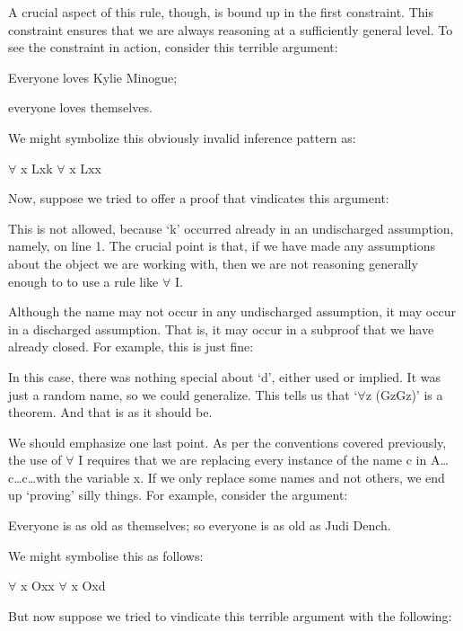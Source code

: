 A crucial aspect of this rule, though, is bound up in the first constraint. This constraint ensures that we are always reasoning at a sufficiently general level. To see the constraint in action, consider this terrible argument:
\begin{earg}
\item[]Everyone loves Kylie Minogue; 
\item[\therefore] everyone loves themselves.
\end{earg}
We might symbolize this obviously invalid inference pattern as:
\begin{center}
$\forall$ x Lxk \therefore  $\forall$ x Lxx
\end{center}
Now, suppose we tried to offer a proof that vindicates this argument:
\begin{fitchproof}
\end{fitchproof}

This is not allowed, because ‘k’ occurred already in an undischarged assumption, namely, on line 1. The crucial point is that, if we have made any assumptions about the object we are working with, then we are not reasoning generally enough to to use a rule like $\forall$ I.

Although the name may not occur in any undischarged assumption, it may occur in a discharged assumption. That is, it may occur in a subproof that we have already closed. For example, this is just fine:
\begin{fitchproof}
\open
\close
{}
\end{fitchproof}
In this case, there was nothing special about ‘d', either used or implied. It was just a random name, so we could generalize. This tells us that ‘$\forall$z (Gz\eif Gz)’ is a theorem. And that is as it should be.

We should emphasize one last point. As per the conventions covered previously, the use of $\forall$ I requires that we are replacing every instance of the name c in A\ldots c\ldots c\ldots  with the variable x. If we only replace some names and not others, we end up ‘proving’ silly things. For example, consider the argument:
\begin{earg}
\item[]Everyone is as old as themselves; so everyone is as old as Judi Dench.
\end{earg}
We might symbolise this as follows:
\begin{center}
$\forall$ x Oxx \therefore  $\forall$ x Oxd
\end{center}
But now suppose we tried to vindicate this terrible argument with the following:
\begin{fitchproof}
\end{fitchproof}

